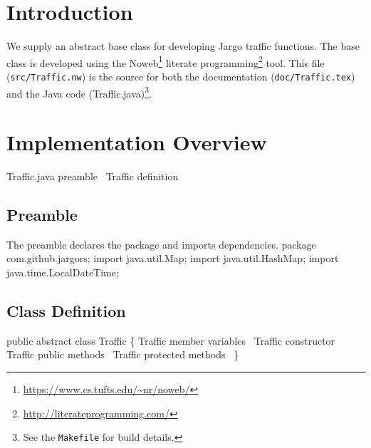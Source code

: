 \section{Introduction}
\label{sec:introduction}
We supply an abstract base class for developing Jargo traffic functions.  The
base class is developed using the
Noweb\footnote{\url{https://www.cs.tufts.edu/~nr/noweb/}} literate
programming\footnote{\url{http://literateprogramming.com/}} tool.  This file
({\tt{}src/Traffic.nw}) is the source for both the documentation
({\tt{}doc/Traffic.tex}) and the Java code (Traffic.java)\footnote{See the
{\tt{}Makefile} for build details.}.


\section{Implementation Overview}
\endmoddef{}
\LA{}Traffic.java preamble~{\nwtagstyle{}}\RA{}
\LA{}\code{}Traffic\edoc{} definition~{\nwtagstyle{}}\RA{}
\nwendcode{}\nwdocspar

\subsection{Preamble}
The preamble declares the package and imports dependencies.
\nwenddocs{}\endmoddef{}
package com.github.jargors;
import java.util.Map;
import java.util.HashMap;
import java.time.LocalDateTime;
\nwendcode{}\nwdocspar

\subsection{Class Definition}
\nwenddocs{}\endmoddef{}
public abstract class Traffic \{
  \LA{}\code{}Traffic\edoc{} member variables~{\nwtagstyle{}}\RA{}
  \LA{}\code{}Traffic\edoc{} constructor~{\nwtagstyle{}}\RA{}
  \LA{}\code{}Traffic\edoc{} public methods~{\nwtagstyle{}}\RA{}
  \LA{}\code{}Traffic\edoc{} protected methods~{\nwtagstyle{}}\RA{}
\}
\nwendcode{}\nwdocspar

